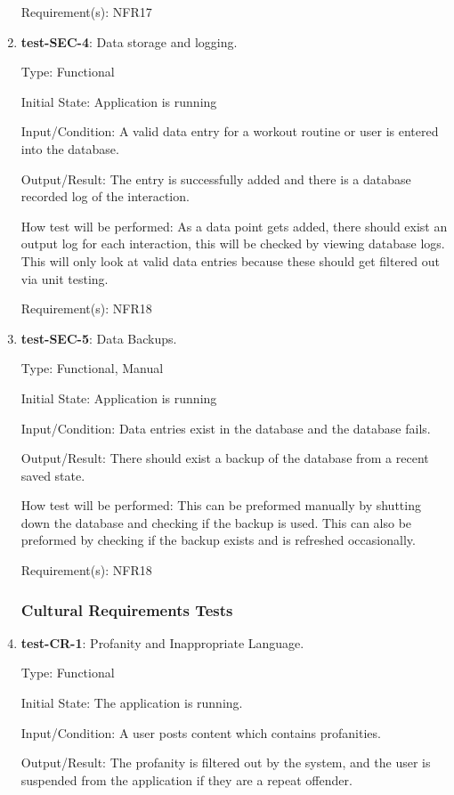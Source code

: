 \documentclass[12pt, titlepage]{article}
\begin{document}
\begin{enumerate}
		Requirement(s): NFR17
		
		\item{\textbf{test-SEC-4}}: Data storage and logging.
		
		Type: Functional
		
		Initial State: Application is running 
		
		Input/Condition: A valid data entry for a workout routine or user is entered into the database.
		
		Output/Result: The entry is successfully added and there is a database recorded log of the interaction.
		
		How test will be performed: As a data point gets added, there should exist an output log for each interaction, this will be checked by viewing database logs. This will only look at valid data entries because these should get filtered out via unit testing.
		
		Requirement(s): NFR18
		
		\item{\textbf{test-SEC-5}}: Data Backups.
		
		Type: Functional, Manual
		
		Initial State: Application is running
		
		Input/Condition: Data entries exist in the database and the database fails.
		
		Output/Result: There should exist a backup of the database from a recent saved state.
		
		How test will be performed: This can be preformed manually by shutting down the database and checking if the backup is used. This can also be preformed by checking if the backup exists and is refreshed occasionally.
		
		Requirement(s): NFR18
	\subsubsection{Cultural Requirements Tests}
		\item{\textbf{test-CR-1}}: Profanity and Inappropriate Language.
		
		Type: Functional
		
		Initial State: The application is running.
		
		Input/Condition: A user posts content which contains profanities.
		
		Output/Result: The profanity is filtered out by the system, and the user is suspended from the application if they are a repeat offender.
		

\end{enumerate}
\end{document}

